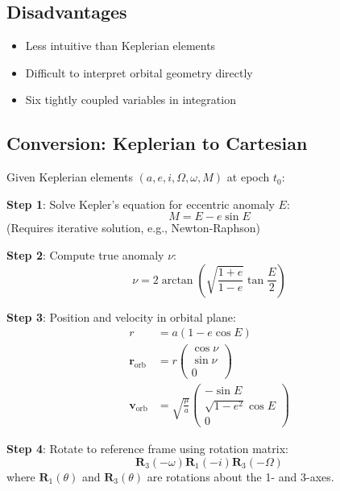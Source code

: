 \subsection{Disadvantages}
\begin{itemize}
    \item Less intuitive than Keplerian elements
    \item Difficult to interpret orbital geometry directly
    \item Six tightly coupled variables in integration
\end{itemize}

\subsection{Conversion: Keplerian to Cartesian}

Given Keplerian elements $(a, e, i, \Omega, \omega, M)$ at epoch $t_0$:

\textbf{Step 1}: Solve Kepler's equation for eccentric anomaly $E$:
\begin{equation}
    M = E - e\sin E
\end{equation}
(Requires iterative solution, e.g., Newton-Raphson)

\textbf{Step 2}: Compute true anomaly $\nu$:
\begin{equation}
    \nu = 2\arctan\left(\sqrt{\frac{1+e}{1-e}}\tan\frac{E}{2}\right)
\end{equation}

\textbf{Step 3}: Position and velocity in orbital plane:
\begin{align}
    r &= a(1 - e\cos E) \\
    \mathbf{r}_{\text{orb}} &= r\begin{pmatrix} \cos\nu \\ \sin\nu \\ 0 \end{pmatrix} \\
    \mathbf{v}_{\text{orb}} &= \sqrt{\frac{\mu}{a}}\begin{pmatrix} -\sin E \\ \sqrt{1-e^2}\cos E \\ 0 \end{pmatrix}
\end{align}

\textbf{Step 4}: Rotate to reference frame using rotation matrix:
\begin{equation}
    \mathbf{R}_{3}(-\omega)\mathbf{R}_{1}(-i)\mathbf{R}_{3}(-\Omega)
\end{equation}
where $\mathbf{R}_1(\theta)$ and $\mathbf{R}_3(\theta)$ are rotations about the 1- and 3-axes.

